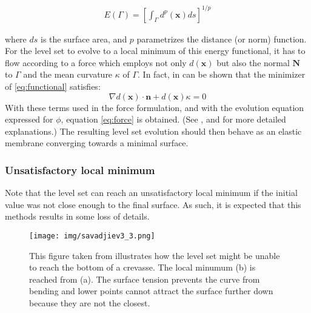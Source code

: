 \documentclass{article}
\begin{document}
\begin{align}
    \label{eq:functional}
    E(\Gamma) = [\int_\Gamma d^p(\mathbf{x}) ds]^{1/p}
\end{align}

where $ds$ is the surface area, and $p$ parametrizes the distance (or norm)
function. For the level set to evolve to a local minimum of this energy
functional, it has to flow according to a force which employs not only
$d(\mathbf{x})$ but also the normal $\mathbf{N}$ to $\Gamma$ and the mean
curvature $\kappa$ of $\Gamma$. In fact, in can be shown that the minimizer of
\eqref{eq:functional} satisfies:
\[
\nabla d(\mathbf{x}) \cdot \mathbf{n} + d(\mathbf{x}) \kappa = 0
\]
With these terms used in the force formulation, and with the evolution equation
expressed for $\phi$, equation \eqref{eq:force} is obtained. (See \cite{zhao2000implicit},
\cite{zhao2001fast} and \cite{savadjiev2003surface} for more detailed
explanations.) The resulting level set evolution should then behave as an
elastic membrane converging towards a minimal surface.


\subsubsection{Unsatisfactory local minimum}
\label{localmin}
Note that the level set can reach an unsatisfactory local minimum if the initial
value was not close enough to the final surface. As such, it is expected that
this methods results in some loss of details.

\begin{figure}[H]
  \centering
  \texttt{[image: img/savadjiev3\_3.png]}
  \caption{This figure taken from \cite{savadjiev2003surface} illustrates
  how the level set might be unable to reach the bottom of a crevasse. The local
  minumum (b) is reached from (a). The surface tension prevents the curve from
  bending and lower points cannot attract the surface further down because they
  are not the closest.}    
\end{figure}
\end{document}
